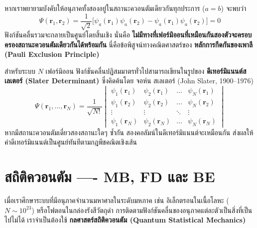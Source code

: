 หากเราพยายามบังคับให้อนุภาคทั้งสองอยู่ในสถานะควอนตัมเดียวกันทุกประการ ($a = b$) จะพบว่า
\begin{equation}
\Psi(\mathbf{r}_1, \mathbf{r}_2) = \frac{1}{\sqrt{2}} \Big[ \psi_a(\mathbf{r}_1)\psi_a(\mathbf{r}_2) - \psi_a(\mathbf{r}_1)\psi_a(\mathbf{r}_2) \Big] = 0
\end{equation}
ฟังก์ชันคลื่นรวมจะกลายเป็นศูนย์โดยสิ้นเชิง นั่นคือ \textbf{ไม่มีทางที่เฟอร์มิออนที่เหมือนกันสองตัวจะครอบครองสถานะควอนตัมเดียวกันได้พร้อมกัน} นี่คือข้อพิสูจน์ทางคณิตศาสตร์ของ \textbf{หลักการกีดกันของเพาลี (Pauli Exclusion Principle)}

สำหรับระบบ $N$ เฟอร์มิออน ฟังก์ชันคลื่นปฏิสมมาตรทั่วไปสามารถเขียนในรูปของ \textbf{ดีเทอร์มิแนนต์สเลเตอร์ (Slater Determinant)} ซึ่งคิดค้นโดย จอห์น สเลเตอร์ (John Slater, 1900--1976)
\begin{equation}
\Psi(\mathbf{r}_1, \dots, \mathbf{r}_N) = \frac{1}{\sqrt{N!}} \begin{vmatrix}
\psi_1(\mathbf{r}_1) & \psi_2(\mathbf{r}_1) & \dots & \psi_N(\mathbf{r}_1) \\
\psi_1(\mathbf{r}_2) & \psi_2(\mathbf{r}_2) & \dots & \psi_N(\mathbf{r}_2) \\
\vdots & \vdots & \ddots & \vdots \\
\psi_1(\mathbf{r}_N) & \psi_2(\mathbf{r}_N) & \dots & \psi_N(\mathbf{r}_N)
\end{vmatrix}
\label{eq:slater_determinant}
\end{equation}
หากมีสถานะควอนตัมเดี่ยวสองสถานะใดๆ ซ้ำกัน สองคอลัมน์ในดีเทอร์มิแนนต์จะเหมือนกัน ส่งผลให้ค่าดีเทอร์มิแนนต์เป็นศูนย์ทันทีตามกฎพีชคณิตเชิงเส้น

\section{สถิติควอนตัม ---- MB, FD และ BE}

เมื่อเราศึกษาระบบที่มีอนุภาคจำนวนมหาศาลในระดับมหภาค เช่น อิเล็กตรอนในเนื้อโลหะ ($N \sim 10^{23}$) หรือโฟตอนในกล่องรังสีวัตถุดำ การติดตามฟังก์ชันคลื่นของอนุภาคแต่ละตัวเป็นสิ่งที่เป็นไปไม่ได้ เราจำเป็นต้องใช้ \textbf{กลศาสตร์สถิติควอนตัม (Quantum Statistical Mechanics)}

